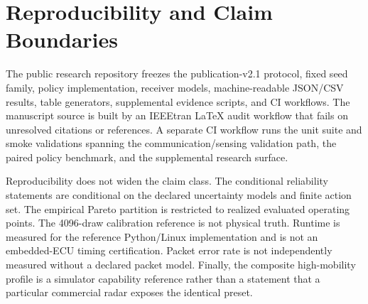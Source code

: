 \documentclass[journal]{IEEEtran}
\begin{document}




\figUncertaintyTradeoff
\figFiniteDrawCalibration
\figRuntimeScaling

\section{Reproducibility and Claim Boundaries}
\label{sec:reproducibility}
The public research repository freezes the publication-v2.1 protocol, fixed seed family, policy implementation, receiver models, machine-readable JSON/CSV results, table generators, supplemental evidence scripts, and CI workflows. The manuscript source is built by an IEEEtran LaTeX audit workflow that fails on unresolved citations or references. A separate CI workflow runs the unit suite and smoke validations spanning the communication/sensing validation path, the paired policy benchmark, and the supplemental research surface.

Reproducibility does not widen the claim class. The conditional reliability statements are conditional on the declared uncertainty models and finite action set. The empirical Pareto partition is restricted to realized evaluated operating points. The 4096-draw calibration reference is not physical truth. Runtime is measured for the reference Python/Linux implementation and is not an embedded-ECU timing certification. Packet error rate is not independently measured without a declared packet model. Finally, the composite high-mobility profile is a simulator capability reference rather than a statement that a particular commercial radar exposes the identical preset.
\end{document}
